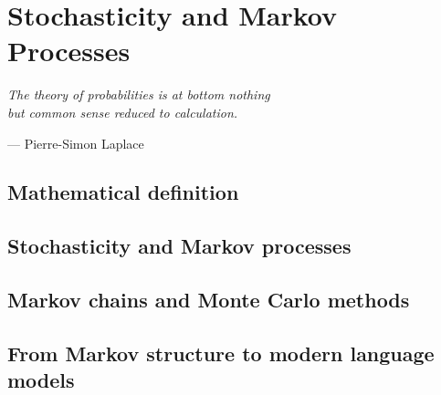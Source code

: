 
\chapter{Stochasticity and Markov Processes}
\label{chapter7}

\epigraph{\textit{The theory of probabilities is at bottom nothing\\but common sense reduced to calculation.}}{— Pierre-Simon Laplace}

\section{Mathematical definition}

\section{Stochasticity and Markov processes}

\section{Markov chains and Monte Carlo methods}

\section{From Markov structure to modern language models}
